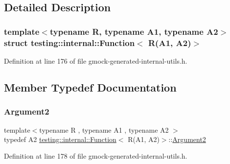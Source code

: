 \subsection{Detailed Description}
\subsubsection*{template$<$typename R, typename A1, typename A2$>$\newline
struct testing\+::internal\+::\+Function$<$ R(\+A1, A2)$>$}



Definition at line 176 of file gmock-\/generated-\/internal-\/utils.\+h.



\subsection{Member Typedef Documentation}
\mbox{\label{structtesting_1_1internal_1_1Function_3_01R_07A1_00_01A2_08_4_a025f5192252366d73aa19718bb0ea89d}} 
\subsubsection{\texorpdfstring{Argument2}{Argument2}}
{\footnotesize\ttfamily template$<$typename R , typename A1 , typename A2 $>$ \\
typedef A2 \hyperlink{structtesting_1_1internal_1_1Function}{testing\+::internal\+::\+Function}$<$ R(A1, A2)$>$\+::\hyperlink{structtesting_1_1internal_1_1Function_3_01R_07A1_00_01A2_08_4_a025f5192252366d73aa19718bb0ea89d}{Argument2}}



Definition at line 178 of file gmock-\/generated-\/internal-\/utils.\+h.

\mbox{\label{structtesting_1_1internal_1_1Function_3_01R_07A1_00_01A2_08_4_ad07042129ff6370f55a279ad12f5e80f}} 
